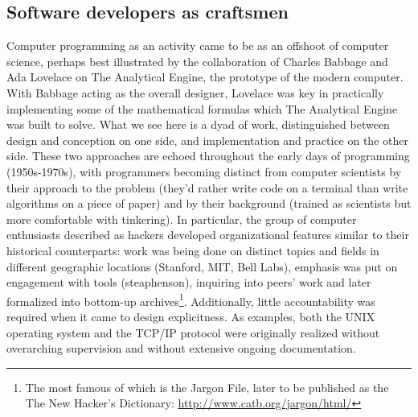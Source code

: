 \documentclass{article}
\begin{document}
\subsection{Software developers as craftsmen}

Computer programming as an activity came to be as an offshoot of computer science, perhaps best illustrated by the collaboration of Charles Babbage and Ada Lovelace on The Analytical Engine, the prototype of the modern computer. With Babbage acting as the overall designer, Lovelace was key in practically implementing some of the mathematical formulas which The Analytical Engine was built to solve. What we see here is a dyad of work, distinguished between design and conception on one side, and implementation and practice on the other side. These two approaches are echoed throughout the early days of programming (1950s-1970s), with programmers becoming distinct from computer scientists by their approach to the problem (they'd rather write code on a terminal than write algorithms on a piece of paper) and by their background (trained as scientists but more comfortable with tinkering)\cite{ensmenger_computer_2012}. In particular, the group of computer enthusiasts described as hackers developed organizational features similar to their historical counterparts: work was being done on distinct topics and fields in different geographic locations (Stanford, MIT, Bell Labs)\cite{raymond_cathedral_2001}, emphasis was put on engagement with tools (steaphenson), inquiring into peers' work\cite{levy_hackers_2010} and later formalized into bottom-up archives\footnote{The most famous of which is the Jargon File, later to be published as the The New Hacker's Dictionary: \url{http://www.catb.org/jargon/html/}}. Additionally, little accountability was required when it came to design explicitness. As examples, both the UNIX operating system and the TCP/IP protocol were originally realized without overarching supervision and without extensive ongoing documentation\cite{seibel_coders_2009,raymond_cathedral_2001}.
\end{document}
